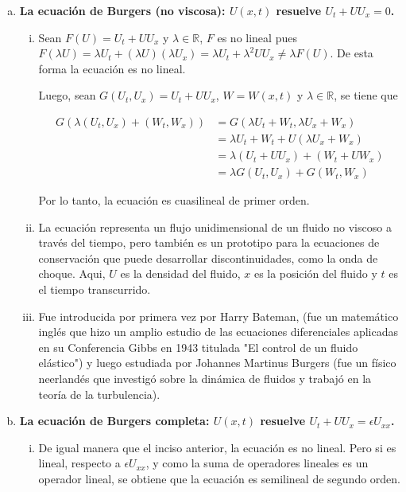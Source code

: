 \documentclass[fleqn]{article}
\newcommand{\real}{\mathbb{R}}
\begin{document}
\begin{enumerate}[(a)]
		\item \textbf{La ecuación de Burgers (no viscosa): $ U(x,t) $ resuelve $ U_t + U U_x = 0 $.}
		
		\begin{enumerate}[(i)]
			\item Sean $ F(U) = U_t + U U_x $ y $ \lambda \in \real $, $ F $ es no lineal pues $ F(\lambda U) = \lambda U_t + (\lambda U)(\lambda U_x) = \lambda U_t + \lambda^2 U U_x \neq \lambda F(U) $. De esta forma la ecuación es no lineal. 
			
			Luego, sean $ G(U_t, U_x) = U_t + U U_x $, $ W = W(x,t) $ y $ \lambda \in \real $, se tiene que

			\begin{align*}
				G(\lambda (U_t, U_x) + (W_t, W_x)) &= G(\lambda U_t + W_t, \lambda U_x + W_x) \\
				&= \lambda U_t + W_t + U (\lambda U_x + W_x) \\
				&= \lambda (U_t + U U_x) + (W_t + U W_x) \\
				&= \lambda G(U_t, U_x) + G(W_t, W_x)
			\end{align*}
			
			Por lo tanto, la ecuación es cuasilineal de primer orden.

			\item La ecuación representa un flujo unidimensional de un fluido no viscoso a través del tiempo, pero también es un prototipo para la ecuaciones de conservación que puede desarrollar discontinuidades, como la onda de choque. Aqui, $ U $ es la densidad del fluido, $ x $ es la posición del fluido y $ t $ es el tiempo transcurrido.
			
			\item Fue introducida por primera vez por Harry Bateman, (fue un matemático inglés que hizo un amplio estudio de las ecuaciones diferenciales aplicadas en su Conferencia Gibbs en 1943 titulada "El control de un fluido elástico") y luego estudiada por Johannes Martinus Burgers (fue un físico neerlandés que investigó sobre la dinámica de fluidos y trabajó en la teoría de la turbulencia).
		\end{enumerate}

		\item \textbf{La ecuación de Burgers completa: $ U(x,t) $ resuelve $ U_t + U U_x = \epsilon U_{xx} $.}
		
		\begin{enumerate}[(i)]
			\item De igual manera que el inciso anterior, la ecuación es no lineal. Pero si es lineal, respecto a $ \epsilon U_{xx} $, y como la suma de operadores lineales es un operador lineal, se obtiene que la ecuación es semilineal de segundo orden.
			

\end{enumerate}
\end{enumerate}
\end{document}
